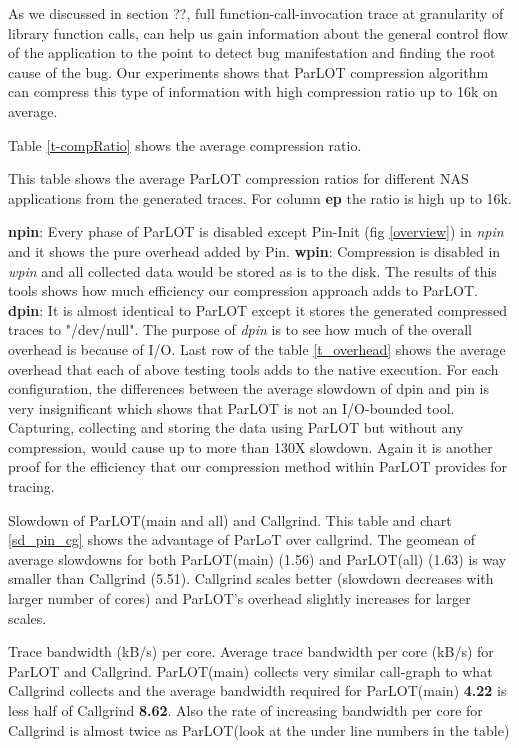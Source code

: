As we discussed in section ??, full function-call-invocation trace at granularity of library function calls, can help us gain information about the general control flow of the application to the point to detect bug manifestation and finding the root cause of the bug.
Our experiments shows that ParLOT compression algorithm can compress this type of information with high compression ratio up to 16k on average. 

Table \ref{t-compRatio} shows the average compression ratio. 





This table shows the average ParLOT compression ratios for different NAS applications from the generated traces. For column \textbf{ep} the ratio is high up to 16k.



\textbf{npin}: Every phase of ParLOT is disabled except Pin-Init (fig \ref{overview}) in \textit{npin} and it shows the pure overhead added by Pin. 
\textbf{wpin}: Compression is disabled in \textit{wpin} and all collected data would be stored as is to the disk. The results of this tools shows how much efficiency our compression approach adds to ParLOT. 
\textbf{dpin}: It is almost identical to ParLOT except it stores the generated compressed traces to "/dev/null". The purpose of \textit{dpin} is to see how much of the overall overhead is because of I/O.
Last row of the table \ref{t_overhead} shows the average overhead that each of above testing tools adds to the native execution. For each configuration, the differences between the average slowdown of dpin and pin is very insignificant which shows that ParLOT is not an I/O-bounded tool. 
Capturing, collecting and storing the data using ParLOT but without any compression, would cause up to more than 130X slowdown. Again it is another proof for the efficiency that our compression method within ParLOT provides for tracing.

Slowdown of ParLOT(main and all) and Callgrind. This table and chart \ref{sd_pin_cg} shows the advantage of ParLoT over callgrind. The geomean of average slowdowns for both ParLOT(main) (1.56) and ParLOT(all) (1.63) is way smaller than Callgrind (5.51). Callgrind scales better (slowdown decreases with larger number of cores) and ParLOT's overhead slightly increases for larger scales.


Trace bandwidth (kB/s) per core. Average trace bandwidth per core (kB/s) for ParLOT and Callgrind. ParLOT(main) collects very similar call-graph to what Callgrind collects and the average bandwidth required for ParLOT(main) \textbf{4.22} is less half of Callgrind \textbf{8.62}. Also the rate of increasing bandwidth per core for Callgrind is almost twice as ParLOT(look at the \text under line numbers in the table)
    
